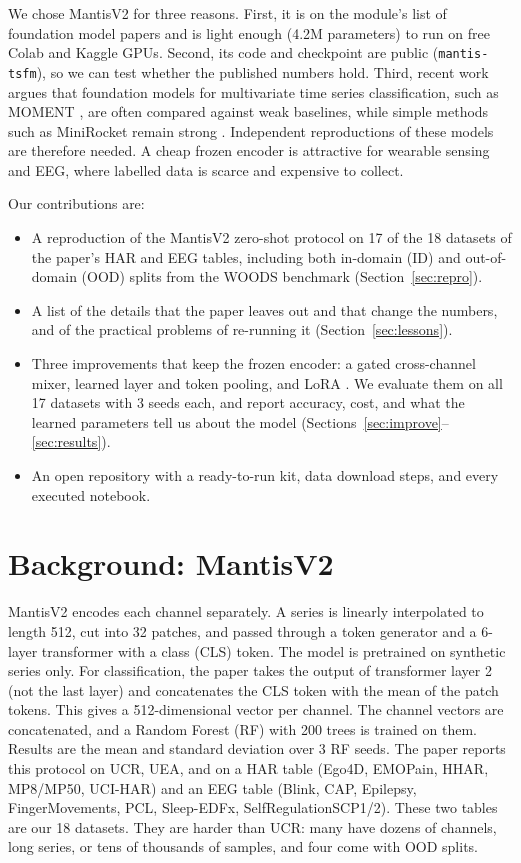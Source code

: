 \documentclass[conference]{IEEEtran}
\begin{document}
We chose MantisV2 for three reasons. First, it is on the module's list of foundation model papers and is light
enough (4.2M parameters) to run on free Colab and Kaggle GPUs. Second, its code and checkpoint are public
(\texttt{mantis-tsfm}), so we can test whether the published numbers hold. Third, recent work argues that foundation
models for multivariate time series classification, such as MOMENT \cite{moment}, are often compared against weak
baselines, while simple methods such as MiniRocket \cite{minirocket} remain strong \cite{fm4mtsc,bakeoff}. Independent
reproductions \cite{pineau} of these models are therefore needed. A cheap frozen encoder is attractive for
wearable sensing and EEG, where labelled data is scarce and expensive to collect.

Our contributions are:
\begin{itemize}
\item A reproduction of the MantisV2 zero-shot protocol on 17 of the 18 datasets of the paper's HAR and EEG tables,
including both in-domain (ID) and out-of-domain (OOD) splits from the WOODS benchmark \cite{woods}
(Section~\ref{sec:repro}).
\item A list of the details that the paper leaves out and that change the numbers, and of the practical problems of
re-running it (Section~\ref{sec:lessons}).
\item Three improvements that keep the frozen encoder: a gated cross-channel mixer, learned layer and token
pooling, and LoRA \cite{lora}. We evaluate them on all 17 datasets with 3 seeds each, and report accuracy, cost, and
what the learned parameters tell us about the model (Sections~\ref{sec:improve}--\ref{sec:results}).
\item An open repository with a ready-to-run kit, data download steps, and every executed notebook.
\end{itemize}

\section{Background: MantisV2}

MantisV2 encodes each channel separately. A series is linearly interpolated to length 512, cut into 32 patches,
and passed through a token generator and a 6-layer transformer with a class (CLS) token. The model is pretrained on
synthetic series only. For classification, the paper takes the output of transformer layer 2 (not the last layer)
and concatenates the CLS token with the mean of the patch tokens. This gives a 512-dimensional vector per channel.
The channel vectors are concatenated, and a Random Forest (RF) \cite{rf} with 200 trees is trained on them. Results are the mean
and standard deviation over 3 RF seeds. The paper reports this protocol on UCR, UEA, and on a HAR table (Ego4D,
EMOPain, HHAR, MP8/MP50, UCI-HAR) and an EEG table (Blink, CAP, Epilepsy, FingerMovements, PCL, Sleep-EDFx,
SelfRegulationSCP1/2). These two tables are our 18 datasets. They are harder than UCR: many have dozens of channels,
long series, or tens of thousands of samples, and four come with OOD splits.
\end{document}
